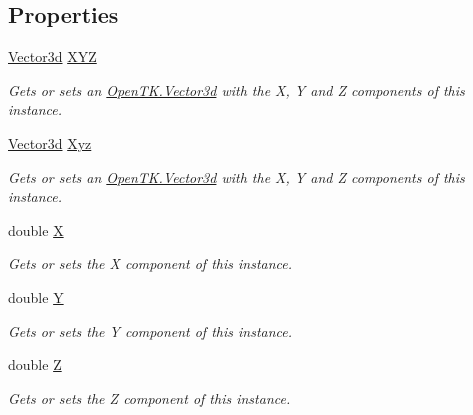 \subsection*{Properties}
\begin{DoxyCompactItemize}
\item 
\hyperlink{struct_open_t_k_1_1_vector3d}{Vector3d} \hyperlink{struct_open_t_k_1_1_quaterniond_aaa7eee901e44e92bdeeaa260f100f3ea}{X\-Y\-Z}
\begin{DoxyCompactList}\small\item\em Gets or sets an \hyperlink{struct_open_t_k_1_1_vector3d}{Open\-T\-K.\-Vector3d} with the X, Y and Z components of this instance. \end{DoxyCompactList}\item 
\hyperlink{struct_open_t_k_1_1_vector3d}{Vector3d} \hyperlink{struct_open_t_k_1_1_quaterniond_a4be7aa1af1afd9ab2f1cba872a191f70}{Xyz}
\begin{DoxyCompactList}\small\item\em Gets or sets an \hyperlink{struct_open_t_k_1_1_vector3d}{Open\-T\-K.\-Vector3d} with the X, Y and Z components of this instance. \end{DoxyCompactList}\item 
double \hyperlink{struct_open_t_k_1_1_quaterniond_ad327401a2d49e95a009185f844238046}{X}
\begin{DoxyCompactList}\small\item\em Gets or sets the X component of this instance. \end{DoxyCompactList}\item 
double \hyperlink{struct_open_t_k_1_1_quaterniond_ad1e8a8564cc57374f5db3569238b2a77}{Y}
\begin{DoxyCompactList}\small\item\em Gets or sets the Y component of this instance. \end{DoxyCompactList}\item 
double \hyperlink{struct_open_t_k_1_1_quaterniond_a5dfcea3ee6e2541d0539ec4947a8677c}{Z}
\begin{DoxyCompactList}\small\item\em Gets or sets the Z component of this instance. \end{DoxyCompactList}\item 

\end{DoxyCompactItemize}

